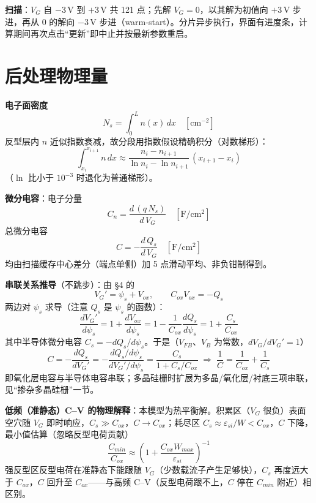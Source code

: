 \documentclass[11pt]{ctexart}
\begin{document}
\textbf{扫描}：$V_G$ 自 $-3\,\mathrm{V}$ 到 $+3\,\mathrm{V}$ 共 121 点；先解 $V_G=0$，以其解为初值向 $+3\,\mathrm{V}$ 步进，再从 $0$ 的解向 $-3\,\mathrm{V}$ 步进（warm-start）。分片异步执行，界面有进度条，计算期间再次点击“更新”即中止并按最新参数重启。

\section{后处理物理量}

\textbf{电子面密度}
\[N_s=\int_0^L n(x)\,dx\quad [\mathrm{cm^{-2}}]\]
反型层内 $n$ 近似指数衰减，故分段用指数假设精确积分（对数梯形）：
\[\int_{x_i}^{x_{i+1}}n\,dx\approx\frac{n_i-n_{i+1}}{\ln n_i-\ln n_{i+1}}\,(x_{i+1}-x_i)\]
（$\ln$ 比小于 $10^{-3}$ 时退化为普通梯形）。

\textbf{微分电容}：电子分量
\[C_n=\frac{d\,(q\,N_s)}{d\,V_G}\quad [\mathrm{F/cm^2}]\]
总微分电容
\[C=-\frac{d\,Q_s}{d\,V_G}\quad [\mathrm{F/cm^2}]\]
均由扫描缓存中心差分（端点单侧）加 5 点滑动平均、非负钳制得到。

\textbf{串联关系推导}（不跳步）：由 §4 的
\[V_G'=\psi_s+V_{ox},\qquad C_{ox}V_{ox}=-Q_s\]
两边对 $\psi_s$ 求导（注意 $Q_s$ 是 $\psi_s$ 的函数）：
\[\frac{dV_G'}{d\psi_s}=1+\frac{dV_{ox}}{d\psi_s}=1-\frac{1}{C_{ox}}\frac{dQ_s}{d\psi_s}=1+\frac{C_s}{C_{ox}}\]
其中半导体微分电容
\(C_s=-dQ_s/d\psi_s\)。于是（$V_{FB}$、$V_B$ 为常数，$dV_G/dV_G'=1$）
\[C=-\frac{dQ_s}{dV_G'}=-\frac{dQ_s/d\psi_s}{dV_G'/d\psi_s}=\frac{C_s}{1+C_s/C_{ox}}\;\Longrightarrow\;\frac{1}{C}=\frac{1}{C_{ox}}+\frac{1}{C_s}\]
即氧化层电容与半导体电容串联；多晶硅栅时扩展为多晶/氧化层/衬底三项串联，见“掺杂多晶硅栅”一节。

\textbf{低频（准静态）C–V 的物理解释}：本模型为热平衡解。积累区（$V_G$ 很负）表面空穴随 $V_G$ 即时响应，$C_s\gg C_{ox}$，$C\to C_{ox}$；耗尽区 $C_s\approx\varepsilon_{si}/W<C_{ox}$，$C$ 下降，最小值估算（忽略反型电荷贡献）
\[\frac{C_{min}}{C_{ox}}\approx\left(1+\frac{C_{ox}W_{max}}{\varepsilon_{si}}\right)^{-1}\]
强反型区反型电荷在准静态下能跟随 $V_G$（少数载流子产生足够快），$C_s$ 再度远大于 $C_{ox}$，$C$ 回升至 $C_{ox}$——与高频 C–V（反型电荷跟不上，$C$ 停在 $C_{min}$ 附近）相区别。
\end{document}
